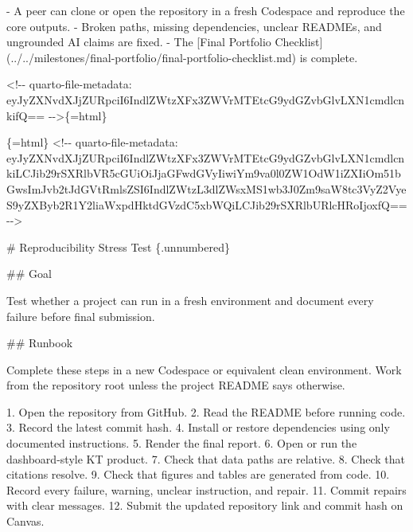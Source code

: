 \documentclass[
  letterpaper,
  DIV=11,
  numbers=noendperiod,
  oneside]{scrreprt}
\newenvironment{Shaded}{\begin{snugshade}}{\end{snugshade}}
\newcommand{\CommentTok}[1]{\textcolor[rgb]{0.37,0.37,0.37}{#1}}
\newcommand{\FunctionTok}[1]{\textcolor[rgb]{0.28,0.35,0.67}{#1}}
\newcommand{\InformationTok}[1]{\textcolor[rgb]{0.37,0.37,0.37}{#1}}
\newcommand{\NormalTok}[1]{\textcolor[rgb]{0.00,0.23,0.31}{#1}}
\newcommand{\OtherTok}[1]{\textcolor[rgb]{0.00,0.23,0.31}{#1}}
\newcommand{\SpecialStringTok}[1]{\textcolor[rgb]{0.13,0.47,0.30}{#1}}
\begin{document}
\begin{Shaded}
\begin{Highlighting}[numbers=left,,]
\SpecialStringTok{{-} }\NormalTok{A peer can clone or open the repository in a fresh Codespace and reproduce the core outputs.}
\SpecialStringTok{{-} }\NormalTok{Broken paths, missing dependencies, unclear READMEs, and ungrounded AI claims are fixed.}
\SpecialStringTok{{-} }\NormalTok{The }\CommentTok{[}\OtherTok{Final Portfolio Checklist}\CommentTok{](../../milestones/final{-}portfolio/final{-}portfolio{-}checklist.md)}\NormalTok{ is complete.}


\InformationTok{\textasciigrave{}\textless{}!{-}{-} quarto{-}file{-}metadata: eyJyZXNvdXJjZURpciI6IndlZWtzXFx3ZWVrMTEtcG9ydGZvbGlvLXN1cmdlcnkifQ== {-}{-}\textgreater{}\textasciigrave{}}\NormalTok{\{=html\}}

\InformationTok{\textasciigrave{}\textasciigrave{}\textasciigrave{}\{=html\}}
\InformationTok{\textless{}!{-}{-} quarto{-}file{-}metadata: eyJyZXNvdXJjZURpciI6IndlZWtzXFx3ZWVrMTEtcG9ydGZvbGlvLXN1cmdlcnkiLCJib29rSXRlbVR5cGUiOiJjaGFwdGVyIiwiYm9va0l0ZW1OdW1iZXIiOm51bGwsImJvb2tJdGVtRmlsZSI6IndlZWtzL3dlZWsxMS1wb3J0Zm9saW8tc3VyZ2VyeS9yZXByb2R1Y2liaWxpdHktdGVzdC5xbWQiLCJib29rSXRlbURlcHRoIjoxfQ== {-}{-}\textgreater{}}
\InformationTok{\textasciigrave{}\textasciigrave{}\textasciigrave{}}

\FunctionTok{\# Reproducibility Stress Test \{.unnumbered\}}


\FunctionTok{\#\# Goal}

\NormalTok{Test whether a project can run in a fresh environment and document every failure before final submission.}

\FunctionTok{\#\# Runbook}

\NormalTok{Complete these steps in a new Codespace or equivalent clean environment. Work from the repository root unless the project README says otherwise.}

\SpecialStringTok{1. }\NormalTok{Open the repository from GitHub.}
\SpecialStringTok{2. }\NormalTok{Read the README before running code.}
\SpecialStringTok{3. }\NormalTok{Record the latest commit hash.}
\SpecialStringTok{4. }\NormalTok{Install or restore dependencies using only documented instructions.}
\SpecialStringTok{5. }\NormalTok{Render the final report.}
\SpecialStringTok{6. }\NormalTok{Open or run the dashboard{-}style KT product.}
\SpecialStringTok{7. }\NormalTok{Check that data paths are relative.}
\SpecialStringTok{8. }\NormalTok{Check that citations resolve.}
\SpecialStringTok{9. }\NormalTok{Check that figures and tables are generated from code.}
\SpecialStringTok{10. }\NormalTok{Record every failure, warning, unclear instruction, and repair.}
\SpecialStringTok{11. }\NormalTok{Commit repairs with clear messages.}
\SpecialStringTok{12. }\NormalTok{Submit the updated repository link and commit hash on Canvas.}


\end{Highlighting}
\end{Shaded}
\end{document}

